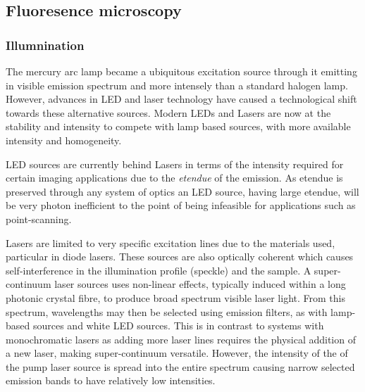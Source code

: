
\subsection{Fluoresence microscopy}

\subsubsection{Illumnination}

The mercury arc lamp became a ubiquitous excitation source through it emitting in visible emission spectrum and more intensely than a standard halogen lamp.
However, advances in LED and laser technology have caused a technological shift towards these alternative sources.
Modern LEDs and Lasers are now at the stability and intensity to compete with lamp based sources, with more available intensity and homogeneity.

LED sources are currently behind Lasers in terms of the intensity required for certain imaging applications due to the \emph{etendue} of the emission.
As etendue is preserved through any system of optics an LED source, having large etendue, will be very photon inefficient to the point of being infeasible for applications such as point-scanning.

Lasers are limited to very specific excitation lines due to the materials used, particular in diode lasers.
These sources are also optically coherent which causes self-interference in the illumination profile (speckle) and the sample.
A super-continuum laser sources uses non-linear effects, typically induced within a long photonic crystal fibre, to produce broad spectrum visible laser light.
From this spectrum, wavelengths may then be selected using emission filters, as with lamp-based sources and white LED sources.
This is in contrast to systems with monochromatic lasers as adding more laser lines requires the physical addition of a new laser, making super-continuum versatile.
However, the intensity of the of the pump laser source is spread into the entire spectrum causing narrow selected emission bands to have relatively low intensities.

